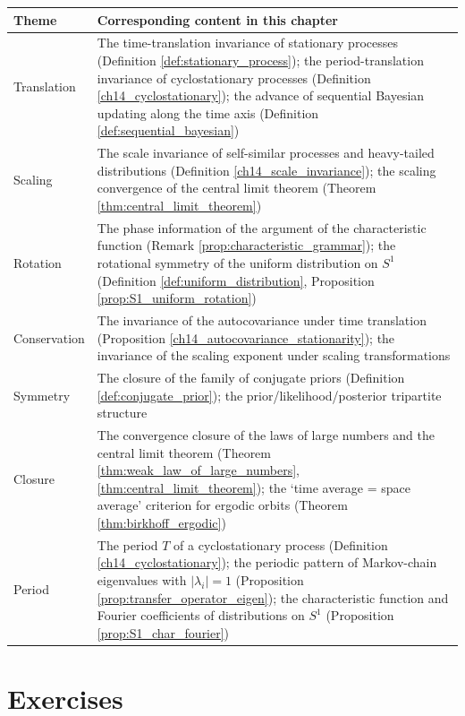 \begin{center}
\renewcommand{\arraystretch}{1.3}
\begin{tabular}{>{\raggedright\arraybackslash}p{2.8cm}>{\raggedright\arraybackslash}p{9.9cm}}
\toprule
Theme & Corresponding content in this chapter \\
\midrule
Translation & The time-translation invariance of stationary processes (Definition \ref{def:stationary_process}); the period-translation invariance of cyclostationary processes (Definition \ref{ch14_cyclostationary}); the advance of sequential Bayesian updating along the time axis (Definition \ref{def:sequential_bayesian}) \\
Scaling & The scale invariance of self-similar processes and heavy-tailed distributions (Definition \ref{ch14_scale_invariance}); the scaling convergence of the central limit theorem (Theorem \ref{thm:central_limit_theorem}) \\
Rotation & The phase information of the argument of the characteristic function (Remark \ref{prop:characteristic_grammar}); the rotational symmetry of the uniform distribution on $S^1$ (Definition \ref{def:uniform_distribution}, Proposition \ref{prop:S1_uniform_rotation}) \\
Conservation & The invariance of the autocovariance under time translation (Proposition \ref{ch14_autocovariance_stationarity}); the invariance of the scaling exponent under scaling transformations \\
Symmetry & The closure of the family of conjugate priors (Definition \ref{def:conjugate_prior}); the prior/likelihood/posterior tripartite structure \\
Closure & The convergence closure of the laws of large numbers and the central limit theorem (Theorem \ref{thm:weak_law_of_large_numbers}, \ref{thm:central_limit_theorem}); the `time average = space average' criterion for ergodic orbits (Theorem \ref{thm:birkhoff_ergodic}) \\
Period & The period $T$ of a cyclostationary process (Definition \ref{ch14_cyclostationary}); the periodic pattern of Markov-chain eigenvalues with $|\lambda_i|=1$ (Proposition \ref{prop:transfer_operator_eigen}); the characteristic function and Fourier coefficients of distributions on $S^1$ (Proposition \ref{prop:S1_char_fourier}) \\
\bottomrule
\end{tabular}
\end{center}

\section*{Exercises}

